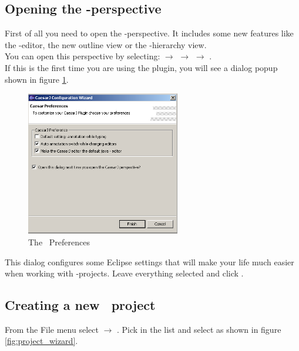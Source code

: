 \subsection{Opening the \caesarj -perspective}
First of all you need to open the \caesarj -perspective. It includes some new features like the \caesar -editor, the new outline view or the \caesarj -hierarchy view.\\
You can open this perspective by selecting:  $\rightarrow$  $\rightarrow$  $\rightarrow$ .\\
If this is the first time you are using the plugin, you will see a dialog popup shown in figure \ref{fig:view_properties}.

\begin{figure}[htbp]
	\centering
		\includegraphics[width=0.60\textwidth]{images/view_properties.png}
	\caption{The \caesarj ~Preferences}	
	\label{fig:view_properties}
\end{figure}

This dialog configures some Eclipse settings that will make your life much easier when
working with \caesarj -projects. Leave everything selected and click
.

\subsection{Creating a new \caesarj ~project \label{creating_project}}
From the File menu select  $\rightarrow$ . Pick  in the list and select  as shown in figure \ref{fig:project_wizard}.

